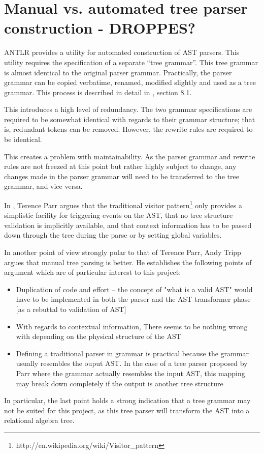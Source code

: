 \section{Manual vs. automated tree parser construction - {DROPPES?}}
ANTLR provides a utility for automated construction of AST parsers. This
utility requires the specification of a separate ``tree grammar''. This tree
grammar is almost identical to the original parser grammar. Practically, the
parser grammar can be copied verbatime, renamed, modified slightly and used as
a tree  grammar. This process is described in detail in \cite{definitiveAntlr},
section 8.1.

This introduces a high level of redundancy. The two grammar specifications are
required to be somewhat identical with regards to their grammar structure; that
is,  redundant tokens can be removed. However, the rewrite rules are required to
be identical.

This creates a problem with maintainability. As the parser grammar and rewrite
rules are not freezed at this point but rather highly subject to change, any
changes made in the parser grammar will need to be transferred to the tree
grammar, and vice versa. 

In \cite{translators_should_use_tree_grammars}, Terence Parr argues that the
traditional visitor
pattern\footnote{http://en.wikipedia.org/wiki/Visitor\_pattern} only provides a
simplistic facility for triggering events on the AST, that no tree structure
validation is implicitly available, and that context information has to be
passed down through the tree during the parse or by setting global variables.

In another point of view strongly polar to that of Terence Parr, Andy Tripp
argues\cite{manual_tree_walking_is_better} that manual tree parsing is
better. He establishes the following points of argument which are of particular
interest to this project:
\begin{itemize}
  \item Duplication of code and effort -- the concept of "what is a valid AST"
  would have to be implemented in both the parser and the AST transformer phase
  [as a rebuttal to validation of AST]
  \item With regards to contextual information, There seems to be nothing wrong
  with depending on the physical structure of the AST 
  \item Defining a traditional parser in grammar is practical because the grammar
  usually resembles the ouput AST. In the case of a tree parser proposed by Parr
  where the grammar actually resembles the input AST, this mapping may break
  down completely if the output is another tree structure
\end{itemize}

In particular, the last point holds a strong indication that a tree grammar
may not be suited for this project, as this tree parser will transform the AST
into a relational algebra tree.
